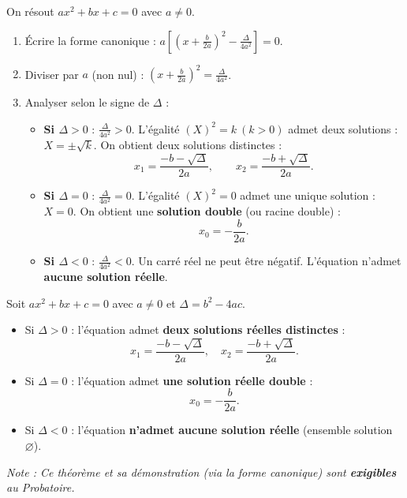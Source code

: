 \documentclass[11pt]{article}
\begin{document}
\begin{experience}
On résout $ax^2+bx+c=0$ avec $a\neq 0$.
\begin{enumerate}
    \item Écrire la forme canonique : $a\left[\left(x+\frac{b}{2a}\right)^2 - \frac{\Delta}{4a^2}\right] = 0$.
    \item Diviser par $a$ (non nul) : $\left(x+\frac{b}{2a}\right)^2 = \frac{\Delta}{4a^2}$.
    \item Analyser selon le signe de $\Delta$ :
    \begin{itemize}
        \item \textbf{Si $\Delta > 0$} : $\frac{\Delta}{4a^2} > 0$. L'égalité $(X)^2 = k\ (k>0)$ admet deux solutions : $X = \pm\sqrt{k}$.
              On obtient deux solutions distinctes :
              \[
              x_1 = \frac{-b-\sqrt{\Delta}}{2a},\qquad x_2 = \frac{-b+\sqrt{\Delta}}{2a}.
              \]
        \item \textbf{Si $\Delta = 0$} : $\frac{\Delta}{4a^2} = 0$. L'égalité $(X)^2 = 0$ admet une unique solution : $X=0$.
              On obtient une \textbf{solution double} (ou racine double) :
              \[
              x_0 = -\frac{b}{2a}.
              \]
        \item \textbf{Si $\Delta < 0$} : $\frac{\Delta}{4a^2} < 0$. Un carré réel ne peut être négatif. L'équation n'admet \textbf{aucune solution réelle}.
    \end{itemize}
\end{enumerate}
\end{experience}

\begin{propriete}
Soit $ax^2+bx+c=0$ avec $a\neq 0$ et $\Delta=b^2-4ac$.
\begin{itemize}
    \item Si $\Delta > 0$ : l'équation admet \textbf{deux solutions réelles distinctes} :
          \[
          x_1 = \frac{-b-\sqrt{\Delta}}{2a},\quad x_2 = \frac{-b+\sqrt{\Delta}}{2a}.
          \]
    \item Si $\Delta = 0$ : l'équation admet \textbf{une solution réelle double} :
          \[
          x_0 = -\frac{b}{2a}.
          \]
    \item Si $\Delta < 0$ : l'équation \textbf{n'admet aucune solution réelle} (ensemble solution $\varnothing$).
\end{itemize}
\emph{Note : Ce théorème et sa démonstration (via la forme canonique) sont \textbf{exigibles} au Probatoire.}
\end{propriete}
\end{document}
